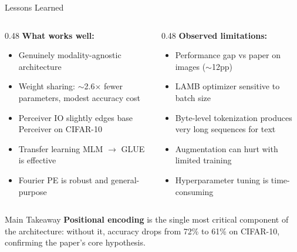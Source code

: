 \documentclass[aspectratio=169,11pt]{beamer}
\begin{document}
\begin{frame}[shrink=5]{Lessons Learned}
  \begin{columns}[T]
    \begin{column}{0.48\textwidth}
      \textbf{What works well:}
      \begin{itemize}
        \item Genuinely \alert{modality-agnostic} architecture
        \item Weight sharing: $\sim$2.6$\times$ fewer parameters, modest accuracy cost
        \item Perceiver IO slightly edges base Perceiver on CIFAR-10
        \item Transfer learning MLM $\rightarrow$ GLUE is effective
        \item Fourier PE is robust and general-purpose
      \end{itemize}
    \end{column}
    \begin{column}{0.48\textwidth}
      \textbf{Observed limitations:}
      \begin{itemize}
        \item Performance gap vs paper on images ($\sim$12pp)
        \item LAMB optimizer sensitive to batch size
        \item Byte-level tokenization produces very long sequences for text
        \item Augmentation can hurt with limited training
        \item Hyperparameter tuning is time-consuming
      \end{itemize}
    \end{column}
  \end{columns}

  \vspace{0.5em}
  \begin{block}{Main Takeaway}
    \textbf{Positional encoding} is the single most critical component of the architecture: without it, accuracy drops from 72\% to 61\% on CIFAR-10, confirming the paper's core hypothesis.
  \end{block}
\end{frame}
\end{document}
